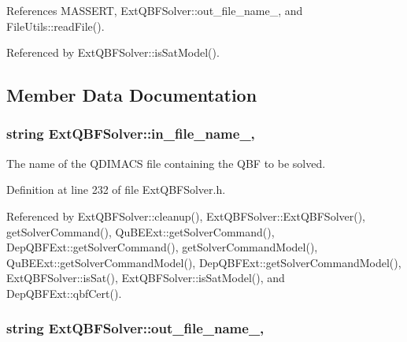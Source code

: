 References M\-A\-S\-S\-E\-R\-T, Ext\-Q\-B\-F\-Solver\-::out\-\_\-file\-\_\-name\-\_\-, and File\-Utils\-::read\-File().



Referenced by Ext\-Q\-B\-F\-Solver\-::is\-Sat\-Model().



\subsection{Member Data Documentation}
\hypertarget{classExtQBFSolver_a04d2ff483c22a11344e46d66ae7e76b1}{
\subsubsection[{in\-\_\-file\-\_\-name\-\_\-}]{\setlength{\rightskip}{0pt plus 5cm}string Ext\-Q\-B\-F\-Solver\-::in\-\_\-file\-\_\-name\-\_\-\hspace{0.3cm}{\ttfamily [protected]}, {\ttfamily [inherited]}}}\label{classExtQBFSolver_a04d2ff483c22a11344e46d66ae7e76b1}


The name of the Q\-D\-I\-M\-A\-C\-S file containing the Q\-B\-F to be solved. 



Definition at line 232 of file Ext\-Q\-B\-F\-Solver.\-h.



Referenced by Ext\-Q\-B\-F\-Solver\-::cleanup(), Ext\-Q\-B\-F\-Solver\-::\-Ext\-Q\-B\-F\-Solver(), get\-Solver\-Command(), Qu\-B\-E\-Ext\-::get\-Solver\-Command(), Dep\-Q\-B\-F\-Ext\-::get\-Solver\-Command(), get\-Solver\-Command\-Model(), Qu\-B\-E\-Ext\-::get\-Solver\-Command\-Model(), Dep\-Q\-B\-F\-Ext\-::get\-Solver\-Command\-Model(), Ext\-Q\-B\-F\-Solver\-::is\-Sat(), Ext\-Q\-B\-F\-Solver\-::is\-Sat\-Model(), and Dep\-Q\-B\-F\-Ext\-::qbf\-Cert().

\hypertarget{classExtQBFSolver_a0efb35aa9b807dec521ad3406eaf664d}{
\subsubsection[{out\-\_\-file\-\_\-name\-\_\-}]{\setlength{\rightskip}{0pt plus 5cm}string Ext\-Q\-B\-F\-Solver\-::out\-\_\-file\-\_\-name\-\_\-\hspace{0.3cm}{\ttfamily [protected]}, {\ttfamily [inherited]}}}\label{classExtQBFSolver_a0efb35aa9b807dec521ad3406eaf664d}


